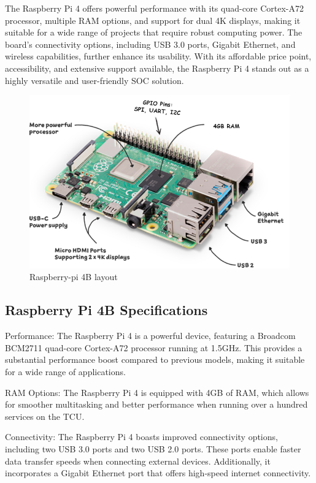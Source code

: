 \documentclass[
12pt,
oneside, 
onehalfspacing, 
nolistspacing, 
parskip, 
chapterinoneline, 
]{AASTCOMPUTER}
\begin{document}
The Raspberry Pi 4 offers powerful performance with its quad-core Cortex-A72 processor, multiple RAM options, and support for dual 4K displays, making it suitable for a wide range of projects that require robust computing power. The board's connectivity options, including USB 3.0 ports, Gigabit Ethernet, and wireless capabilities, further enhance its usability. With its affordable price point, accessibility, and extensive support available, the Raspberry Pi 4 stands out as a highly versatile and user-friendly SOC solution.
\begin{figure}[!ht]
\centering
\includegraphics[scale=0.5]{Figures/6.png}
\caption[Raspberry-pi]{Raspberry-pi 4B layout}
\label{fig:6}
\end{figure}

\subsection{Raspberry Pi 4B Specifications}
Performance: The Raspberry Pi 4 is a powerful device, featuring a Broadcom BCM2711 quad-core Cortex-A72 processor running at 1.5GHz. This provides a substantial performance boost compared to previous models, making it suitable for a wide range of applications.

RAM Options: The Raspberry Pi 4 is equipped with 4GB of RAM, which allows for smoother multitasking and better performance when running over a hundred services on the TCU.

Connectivity: The Raspberry Pi 4 boasts improved connectivity options, including two USB 3.0 ports and two USB 2.0 ports. These ports enable faster data transfer speeds when connecting external devices. Additionally, it incorporates a Gigabit Ethernet port that offers high-speed internet connectivity.
\end{document}
